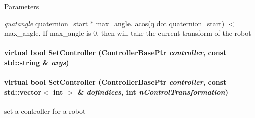 \begin{DoxyParams}{Parameters}
\item[{\em quatangle}]quaternion\_\-start $\ast$ max\_\-angle. acos(q dot quaternion\_\-start) $<$= max\_\-angle. If max\_\-angle is 0, then will take the current transform of the robot \end{DoxyParams}
\hypertarget{classOpenRAVE_1_1RobotBase_a4d4d9910820087bb1a0d916ca1bb0e5c}{
\paragraph[{SetController}]{\setlength{\rightskip}{0pt plus 5cm}virtual bool SetController (ControllerBasePtr {\em controller}, \/  const std::string \& {\em args})}\hfill}
\label{classOpenRAVE_1_1RobotBase_a4d4d9910820087bb1a0d916ca1bb0e5c}
\hypertarget{classOpenRAVE_1_1RobotBase_a8384a87dcfccbd3b27006c1769219c28}{
\paragraph[{SetController}]{\setlength{\rightskip}{0pt plus 5cm}virtual bool SetController (ControllerBasePtr {\em controller}, \/  const std::vector$<$ int $>$ \& {\em dofindices}, \/  int {\em nControlTransformation})}\hfill}
\label{classOpenRAVE_1_1RobotBase_a8384a87dcfccbd3b27006c1769219c28}


set a controller for a robot 


